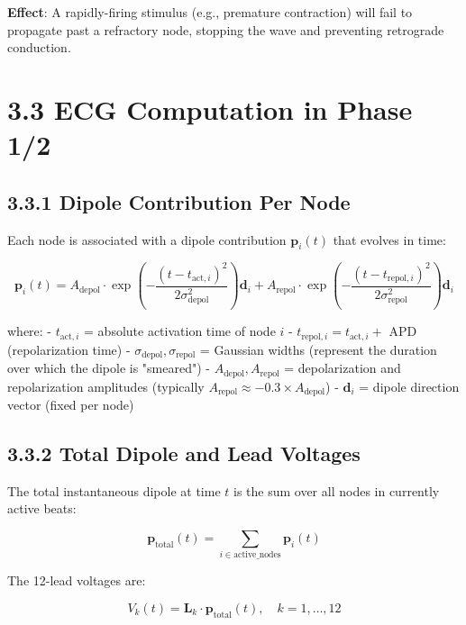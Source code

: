\documentclass[12pt,oneside,a4paper]{book}
\begin{document}
\textbf{Effect}: A rapidly-firing stimulus (e.g., premature contraction) will fail to propagate past a refractory node, stopping the wave and preventing retrograde conduction.

\section{3.3 ECG Computation in Phase 1/2}

\subsection{3.3.1 Dipole Contribution Per Node}

Each node is associated with a dipole contribution $\mathbf{p}_i(t)$ that evolves in time:

\begin{equation}
\mathbf{p}_i(t) = A_{\text{depol}} \cdot \exp\left(-\frac{(t - t_{\text{act},i})^2}{2\sigma_{\text{depol}}^2}\right) \mathbf{d}_i
+ A_{\text{repol}} \cdot \exp\left(-\frac{(t - t_{\text{repol},i})^2}{2\sigma_{\text{repol}}^2}\right) \mathbf{d}_i
\label{eq:dipole_gaussian}
\end{equation}

where:
- $t_{\text{act},i}$ = absolute activation time of node $i$
- $t_{\text{repol},i} = t_{\text{act},i} +$ APD (repolarization time)
- $\sigma_{\text{depol}}, \sigma_{\text{repol}}$ = Gaussian widths (represent the duration over which the dipole is "smeared")
- $A_{\text{depol}}, A_{\text{repol}}$ = depolarization and repolarization amplitudes (typically $A_{\text{repol}} \approx -0.3 \times A_{\text{depol}}$)
- $\mathbf{d}_i$ = dipole direction vector (fixed per node)

\subsection{3.3.2 Total Dipole and Lead Voltages}

The total instantaneous dipole at time $t$ is the sum over all nodes in currently active beats:

\begin{equation}
\mathbf{p}_{\text{total}}(t) = \sum_{i \in \text{active\_nodes}} \mathbf{p}_i(t)
\end{equation}

The 12-lead voltages are:

\begin{equation}
V_k(t) = \mathbf{L}_k \cdot \mathbf{p}_{\text{total}}(t), \quad k = 1, \ldots, 12
\end{equation}
\end{document}
